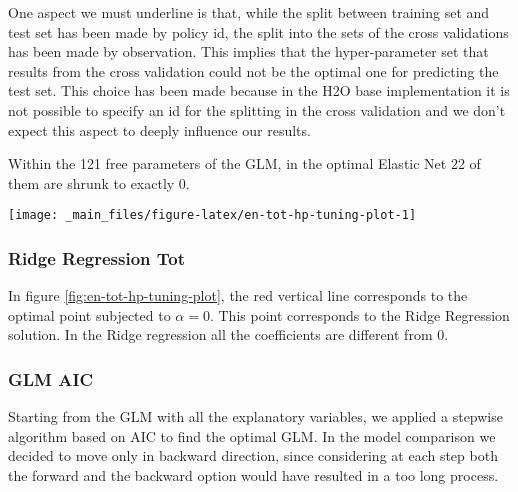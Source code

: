 \documentclass[a4paper, twoside, openright, 12pt]{report}
\let\origfigure\figure
\let\endorigfigure\endfigure
\renewenvironment{figure}[1][2] {
  \expandafter\origfigure\expandafter[!hbtp]
} {
  \endorigfigure
}
\theoremstyle{definition}
\theoremstyle{definition}
\theoremstyle{definition}
\theoremstyle{remark}
\begin{document}
One aspect we must underline is that, while the split between training set and test set has been made by policy id, the split into the sets of the cross validations has been made by observation. This implies that the hyper-parameter set that results from the cross validation could not be the optimal one for predicting the test set. This choice has been made because in the H2O base implementation it is not possible to specify an id for the splitting in the cross validation and we don't expect this aspect to deeply influence our results.

Within the 121 free parameters of the GLM, in the optimal Elastic Net 22 of them are shrunk to exactly 0.





\begin{figure}[!hbtp]

{\centering \texttt{[image: \_main\_files/figure-latex/en-tot-hp-tuning-plot-1]} 

}

\caption[Elastic Net Tot hyper-parameter tuning.]{Elastic Net Tot hyper-parameter tuning. The light blue vertical line corresponds to the optimal point. The red vertical line corresponds to the optimal point subjected to \(\alpha=0\), i.e.~the Ridge Regression solution.}\label{fig:en-tot-hp-tuning-plot}
\end{figure}

\hypertarget{ridge-regression-tot}{%
\subsubsection{Ridge Regression Tot}\label{ridge-regression-tot}}

In figure \ref{fig:en-tot-hp-tuning-plot}, the red vertical line corresponds to the optimal point subjected to \(\alpha=0\). This point corresponds to the Ridge Regression solution. In the Ridge regression all the coefficients are different from 0.

\hypertarget{glm-aic}{%
\subsubsection{GLM AIC}\label{glm-aic}}

Starting from the GLM with all the explanatory variables, we applied a stepwise algorithm based on AIC to find the optimal GLM. In the model comparison we decided to move only in backward direction, since considering at each step both the forward and the backward option would have resulted in a too long process.
\end{document}

